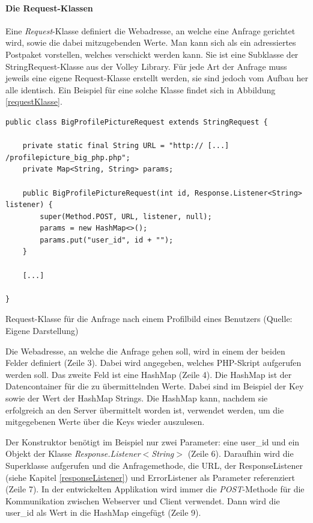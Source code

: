 \documentclass[../main.tex]{subfiles}
\begin{document}
	\paragraph{Die Request-Klassen}
	Eine \emph{Request}-Klasse definiert die Webadresse, an welche eine Anfrage gerichtet wird, sowie die dabei mitzugebenden Werte. Man kann sich als ein adressiertes Postpaket vorstellen, welches verschickt werden kann. Sie ist eine Subklasse der StringRequest-Klasse aus der Volley Library. Für jede Art der Anfrage muss jeweils eine eigene Request-Klasse erstellt werden, sie sind jedoch vom Aufbau her alle identisch. Ein Beispiel für eine solche Klasse findet sich in Abbildung \ref{requestKlasse}.
	
\begin{code}
	\begin{center}
		\begin{verbatim}
public class BigProfilePictureRequest extends StringRequest {

	private static final String URL = "http:// [...] /profilepicture_big_php.php";
	private Map<String, String> params;

	public BigProfilePictureRequest(int id, Response.Listener<String> listener) {
		super(Method.POST, URL, listener, null);
		params = new HashMap<>();
		params.put("user_id", id + "");
	}

	[...]
	
}
		\end{verbatim}
		\caption{Request-Klasse für die Anfrage nach einem Profilbild eines Benutzers (Quelle: Eigene Darstellung)}
		\label{requestKlasse}
	\end{center}
\end{code}

	Die Webadresse, an welche die Anfrage gehen soll, wird in einem der beiden Felder definiert (Zeile 3). Dabei wird angegeben, welches PHP-Skript aufgerufen werden soll. Das zweite Feld ist eine HashMap (Zeile 4). Die HashMap ist der Datencontainer für die zu übermittelnden Werte. Dabei sind im Beispiel der Key sowie der Wert der HashMap Strings. Die HashMap kann, nachdem sie erfolgreich an den Server übermittelt worden ist, verwendet werden, um die mitgegebenen Werte über die Keys wieder auszulesen.
	
	Der Konstruktor benötigt im Beispiel nur zwei Parameter: eine user\_id und ein Objekt der Klasse \emph{Response.Listener$<$String$>$} (Zeile 6). Daraufhin wird die Superklasse aufgerufen und die Anfragemethode, die URL, der ResponseListener (siehe Kapitel \ref{responseListener}) und ErrorListener als Parameter referenziert (Zeile 7). In der entwickelten Applikation wird immer die \emph{POST}-Methode für die Kommunikation zwischen Webserver und Client verwendet. Dann wird die user\_id als Wert in die HashMap eingefügt (Zeile 9).
	
\end{document}

